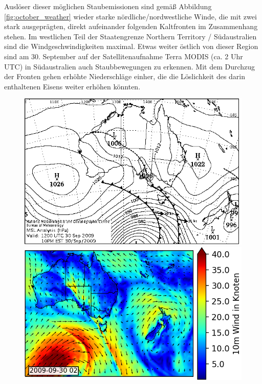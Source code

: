 \documentclass[12pt,a4paper,onecolumn]{scrartcl}
\begin{document}
Auslöser dieser möglichen Staubemissionen sind gemäß Abbildung \ref{fig:october_weather} wieder starke nördliche/nordwestliche Winde, die mit zwei stark ausgeprägten, direkt aufeinander folgenden Kaltfronten im Zusammenhang stehen. Im westlichen Teil der Staatengrenze Northern Territory / Südaustralien sind die Windgeschwindigkeiten maximal. Etwas weiter östlich von dieser Region sind am 30. September auf der Satellitenaufnahme Terra MODIS (ca. 2 Uhr UTC) in Südaustralien auch Staubbewegungen zu erkennen. Mit dem Durchzug der Fronten gehen erhöhte Niederschläge einher, die die Löslichkeit des darin enthaltenen Eisens weiter erhöhen könnten. 
\begin{figure}[!htb]
	\begin{minipage}[c]{0.3\textwidth}
		\includegraphics[width=\textwidth]{bilder/20090930T12_msl.png}
	\end{minipage}\hfill
	\begin{minipage}[c]{0.35\textwidth}
		\includegraphics[width=\textwidth]{bilder/wind_october_small.png}

\end{minipage}
\end{figure}
\end{document}
